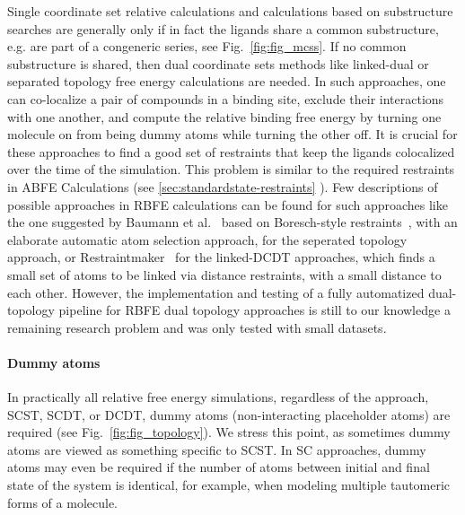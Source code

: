 \documentclass[9pt,bestpractices]{livecoms}
\begin{document}
Single coordinate set relative calculations and calculations based on substructure searches are generally only if in fact the ligands share a common substructure, e.g. are part of a congeneric series, see Fig.~\ref{fig:fig_mcss}.
If no common substructure is shared, then dual coordinate sets methods like linked-dual or separated topology free energy calculations are needed. In such approaches, one can co-localize a pair of compounds in a binding site, exclude their interactions with one another, and compute the relative binding free energy by turning one molecule on from being dummy atoms while turning the other off.
It is crucial for these approaches to find a good set of restraints that keep the ligands colocalized over the time of the simulation. This problem is similar to the required restraints in ABFE Calculations (see \ref{sec:standardstate-restraints} ). Few descriptions of possible approaches in RBFE calculations can be found for such approaches like the one suggested by Baumann et al.~\cite{baumann2023broadening} based on Boresch-style restraints~\cite{boresch2003absolute}, with an elaborate automatic atom selection approach, for the seperated topology approach, or Restraintmaker~\cite{ries2022restraintmaker} for the linked-DCDT approaches, which finds a small set of atoms to be linked via distance restraints, with a small distance to each other. 
However, the implementation and testing of a fully automatized dual-topology pipeline for RBFE dual topology approaches is still to our knowledge a remaining research problem and was only tested with small datasets. \cite{jespers2019qligfep, rieder2022lev}

\paragraph{Dummy atoms} \label{subsec: Dummy Atoms}

In practically all relative free energy simulations, regardless of the approach, SCST, SCDT, or DCDT, dummy atoms (non-interacting placeholder atoms) are required (see Fig.~\ref{fig:fig_topology}). We stress this point, as sometimes dummy atoms are viewed as something specific to SCST. In SC approaches, dummy atoms may even be required if the number of atoms between initial and final state of the system is identical, for example, when modeling multiple tautomeric forms of a molecule.
\end{document}

